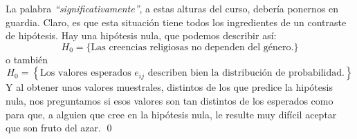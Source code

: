 \begin{ejemplo}
La palabra {\em ``significativamente''}, a estas alturas del curso, debería ponernos en guardia.  Claro, es que esta situación tiene todos los ingredientes de un contraste de hipótesis. Hay una hipótesis nula, que podemos describir así:
    \begin{equation}\label{cap12:ecu:HipotesisNulaEjemploBarometroCIS}
    H_0=\{\mbox{Las creencias religiosas no dependen del género.} \}
    \end{equation}
o también
    \[H_0=\left\{\mbox{Los valores esperados $e_{ij}$ describen bien la distribución de
    probabilidad.}\right\}\]
Y al obtener unos valores muestrales, distintos de los que predice la hipótesis nula, nos  preguntamos si esos valores son tan distintos de los esperados como para que, a alguien que cree en la hipótesis nula, le resulte muy difícil aceptar que son fruto del azar.
\qed
\end{ejemplo}


